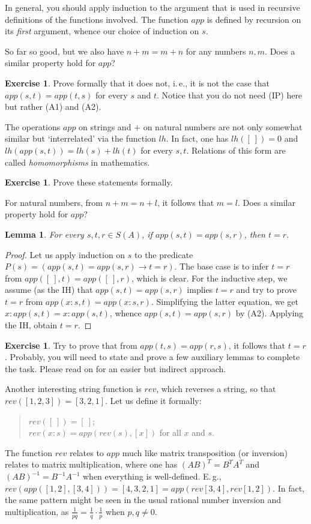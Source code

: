 \documentclass[12pt,notitlepage]{article}
\theoremstyle{plain}
\newtheorem{lemma}[thm]{Lemma}
\theoremstyle{definition}
\newtheorem{exc}[thm]{Exercise}
\theoremstyle{plain}
\newcommand{\1}{\mathbf{1}}
\newcommand{\0}{\mathbf{0}}
\begin{document}
In general, you should apply induction to the argument that is used in recursive definitions of the functions involved. The function $app$ is defined by recursion on its \emph{first} argument, whence our choice of induction on $s$.

\medskip
So far so good, but we also have $n + m = m + n$ for any numbers $n, m$. Does a similar property hold for $app$?
\begin{exc}
Prove formally that it does not, i.\,e., it is not the case that $app(s,t) = app(t,s)$ for every $s$ and $t$. Notice that you do not need (IP) here but rather (A1) and (A2).
\end{exc}

The operations $app$ on strings and $+$ on natural numbers are not only somewhat similar but `interrelated' via the function $lh$. In fact, one has $lh([\ ]) = 0$ and $lh(app(s, t)) = lh(s) + lh(t)$ for every $s, t$. Relations of this form are called \emph{homomorphisms} in mathematics.
\begin{exc}
Prove these statements formally.
\end{exc}

For natural numbers, from $n + m = n + l$, it follows that $m = l$. Does a similar property hold for $app$?
\begin{lemma}\label{cs:app_inv_head}
For every $s, t, r \in S(A)$, if $app(s,t) = app(s,r)$, then $t = r$.
\end{lemma}
\begin{proof}
Let us apply induction on $s$ to the predicate $P(s) = (app(s,t) = app(s,r) \to t = r)$. The base case is to infer $t = r$ from $app([\ ], t) = app([\ ], r)$, which is clear. For the inductive step, we assume (as the IH) that $app(s,t) = app(s,r)$ implies $t = r$ and try to prove $t = r$ from $app(x:s, t) = app(x:s, r)$. Simplifying the latter equation, we get $x : app(s,t) = x : app(s,t)$, whence $app(s,t) = app(s,r)$ by (A2). Applying the IH, obtain $t = r$.
\end{proof}
\begin{exc}
Try to prove that from $app(t,s) = app(r,s)$, it follows that $t = r$. Probably, you will need to state and prove a few auxiliary lemmas to complete the task. Please read on for an easier but indirect approach.
\end{exc}

Another interesting string function is $rev$, which reverses a string, so that $rev([1,2,3]) = [3,2,1]$. Let us define it formally:
\begin{quote}
$rev([\ ]) = [\ ]$;\\
$rev(x : s) = app(rev(s), [x])$ for all $x$ and $s$.
\end{quote}
The function $rev$ relates to $app$ much like matrix transposition (or inversion) relates to matrix multiplication, where one has $(AB)^T = B^T A^T$ and $(AB)^{-1} = B^{-1} A^{-1}$ when everything is well-defined. E.\,g., $rev(app([1,2], [3,4])) = [4,3,2,1] = app(rev[3,4], rev[1,2])$. In fact, the same pattern might be seen in the usual rational number inversion and multiplication, as $\frac{1}{pq} = \frac{1}{q} \cdot \frac{1}{p}$ when $p, q \neq 0$. 
\end{document}
